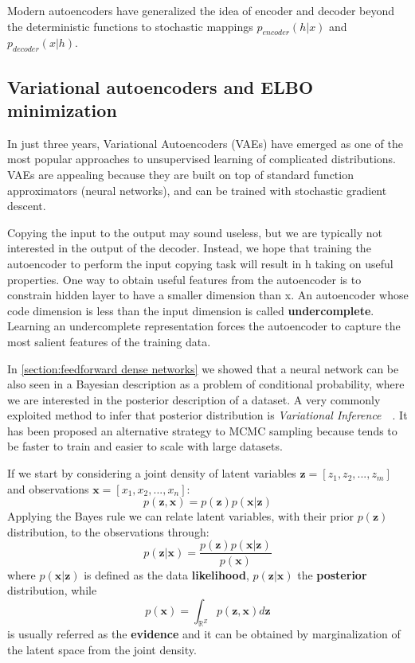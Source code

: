 Modern autoencoders have generalized the idea of encoder and decoder beyond the deterministic functions to stochastic mappings $p_{encoder}(h | x)$ and $p_{decoder}(x | h)$.


\subsection{Variational autoencoders and ELBO minimization}
\label{section:VAE}
In just three years, Variational Autoencoders (VAEs) have emerged as one of the most popular approaches to unsupervised learning of complicated distributions. VAEs are appealing because they are built on top of standard function approximators (neural networks), and can be trained with stochastic gradient descent.

Copying the input to the output may sound useless, but we are typically not interested in the output of the decoder. Instead, we hope that training the autoencoder to perform the input copying task will result in h taking on useful properties. One way to obtain useful features from the autoencoder is to constrain hidden layer to have a smaller dimension than x. An autoencoder whose code dimension is less than the input dimension is called \textbf{undercomplete}. Learning an undercomplete representation forces the autoencoder to capture the most salient features of the training data.


In \cref{section:feedforward dense networks} we showed that a neural network can be also seen in a Bayesian description as a problem of conditional probability, where we are interested in the posterior description of a dataset. A very commonly exploited method to infer that posterior distribution is \textit{Variational Inference}~\cite{Jordan:1999:IVM:339248.339252}~\cite{MAL-001}. It has been proposed an alternative strategy to \ac{MCMC} sampling because tends to be faster to train and easier to scale with large datasets.

If we start by considering a joint density of latent variables $\bm{z} = [z_1, z_2, ...,z_m]$ and observations $\bm{x} = [x_1, x_2, ..., x_n]$:
\begin{equation}
    p(\bm{z},\bm{x}) = p(\bm{z}) p(\bm{x}|\bm{z})
\end{equation}
Applying the Bayes rule we can relate latent variables, with their prior $p(\bm{z})$ distribution, to the observations through:
\begin{equation}
    p(\bm{z}|\bm{x}) = \frac{p(\bm{z})p(\bm{x}|\bm{z})}{p(\bm{x})}
\end{equation}
where $p(\bm{x}|\bm{z})$ is defined as the data \textbf{likelihood}, $p(\bm{z}|\bm{x})$ the \textbf{posterior} distribution, while
\begin{equation}
    p(\bm{x}) = \int_{\mathbb{R}^Z} p(\bm{z}, \bm{x}) d\bm{z}
\end{equation}
is usually referred as the \textbf{evidence} and it can be obtained by marginalization of the latent space from the joint density.

